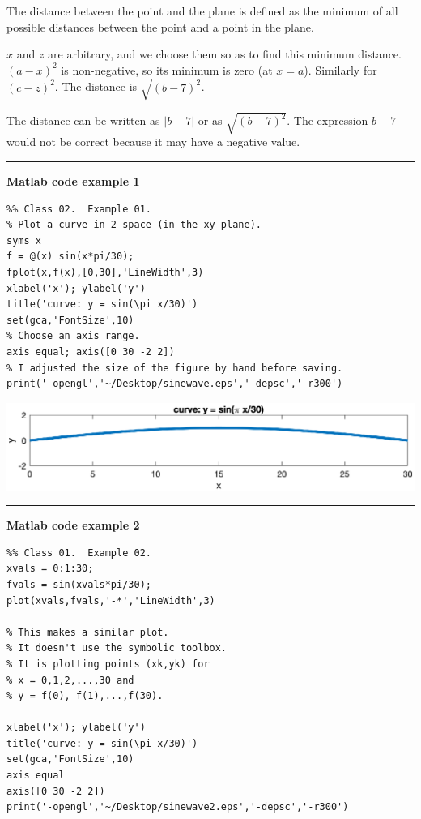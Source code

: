 \documentclass[12pt,letterpaper,noanswers]{exam}
\begin{document}
The distance between the point and the plane is defined as the minimum of all possible distances between the point and a point in the plane.  

$x$ and $z$ are arbitrary, and we choose them so as to find this minimum distance.  $(a-x)^2$ is non-negative, so its minimum is zero (at $x=a$).  Similarly for $(c-z)^2$.  The distance is $\sqrt{(b-7)^2}$.

The distance can be written as $\vert b-7\vert$ or as $\sqrt{(b-7)^2}$.  The expression $b-7$ would not be correct because it may have a negative value.

\vspace{0.2cm}
\hrule
\vspace{0.2cm}

\noindent\textbf{Matlab code example 1}
\begin{lstlisting}
%% Class 02.  Example 01.
% Plot a curve in 2-space (in the xy-plane).
syms x
f = @(x) sin(x*pi/30);
fplot(x,f(x),[0,30],'LineWidth',3)
xlabel('x'); ylabel('y')
title('curve: y = sin(\pi x/30)')
set(gca,'FontSize',10)
% Choose an axis range.
axis equal; axis([0 30 -2 2])
% I adjusted the size of the figure by hand before saving.
print('-opengl','~/Desktop/sinewave.eps','-depsc','-r300')
\end{lstlisting}

\includegraphics[width=\textwidth]{img/sinewave.eps}

\vspace{0.2cm}
\hrule
\vspace{0.2cm}

\noindent\textbf{Matlab code example 2}
\begin{lstlisting}
%% Class 01.  Example 02.
xvals = 0:1:30;
fvals = sin(xvals*pi/30);
plot(xvals,fvals,'-*','LineWidth',3)

% This makes a similar plot.
% It doesn't use the symbolic toolbox.
% It is plotting points (xk,yk) for
% x = 0,1,2,...,30 and
% y = f(0), f(1),...,f(30).

xlabel('x'); ylabel('y')
title('curve: y = sin(\pi x/30)')
set(gca,'FontSize',10)
axis equal
axis([0 30 -2 2])
print('-opengl','~/Desktop/sinewave2.eps','-depsc','-r300')
\end{lstlisting}
\end{document}
